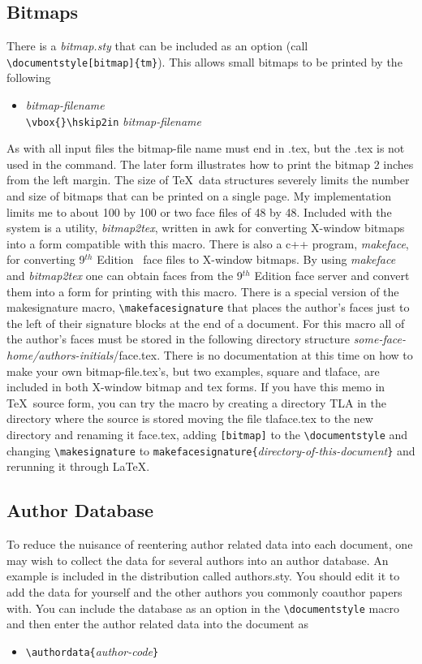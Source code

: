 \subsection{Bitmaps}
There is a {\it bitmap.sty} that can be included as an option (call 
\verb|\documentstyle[bitmap]{tm}|).  This allows small bitmaps to be
printed by the following
\begin{itemize}
\item[]
\verb|| {\it bitmap-filename}\\
\verb|\vbox{}\hskip2in| {\it bitmap-filename}
\end{itemize}
As with all input files the bitmap-file name must end in .tex, but the
.tex is not used in the command.
The later form illustrates how to print the bitmap 2 inches from the
left margin.  The size of \TeX\ data structures severely limits the
number and size of bitmaps that can be printed on a single page.  My
implementation limits me to about 100 by 100 or two face files of 48
by 48.  Included with the system is a utility, {\it bitmap2tex}, written
in awk for converting X-window bitmaps into a form compatible with
this macro.  There is also a c++ program, {\it makeface}, for converting
9$^{th}$ Edition \UNIX\ face files to X-window bitmaps.  By using {\it
makeface} and {\it bitmap2tex} one can obtain faces from the 9$^{th}$
Edition face server and convert them into a form for printing with
this macro.  There is a special version of the makesignature macro,
\verb|\makefacesignature| that places the author's faces just to the
left of their signature blocks at the end of a document.  For this
macro all of the author's faces must be stored in the following
directory structure {\it some-face-home/authors-initials}/face.tex.
There is no documentation at this time on how to make your own
bitmap-file.tex's, but two examples, square and tlaface, are included
in both X-window bitmap and tex forms.  If you have this memo in \TeX\
source form, you can try the macro by creating a directory TLA in the
directory where the source is stored moving the file tlaface.tex to
the new directory and renaming it face.tex, adding \verb|[bitmap]| to the
\verb|\documentstyle| and changing \verb|\makesignature| to
\verb|makefacesignature{|{\it directory-of-this-document}\verb|}| and
rerunning it through \LaTeX .
\subsection{Author Database}
To reduce the nuisance of reentering author related data into each
document, one may wish to collect the data for several authors into an
author database.  An example is included in the distribution called
authors.sty.  You should edit it to add the data for yourself and the
other authors you commonly coauthor papers with.  You can include the
database as an option in the \verb|\documentstyle| macro and then
enter the author related data into the document as
\begin{itemize}
\item[]
\verb|\authordata{|{\it author-code}\verb|}|
\end{itemize}
